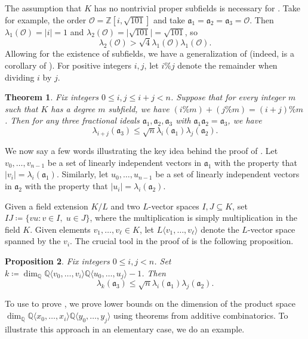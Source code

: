 \documentclass[letterpaper,10pt]{amsart}
\newcommand{\ZZ}{\mathbb{Z}}      %
\newcommand{\QQ}{\mathbb{Q}}      %
\newcommand{\cO}{\mathcal{O}}      %
\newcommand{\mfa}{\mathfrak{a}}
\newtheorem{theorem}{Theorem}[section]
\newtheorem{proposition}[theorem]{Proposition}
\theoremstyle{definition}
\theoremstyle{remark}
\begin{document}
The assumption that $K$ has no nontrivial proper subfields is necessary for . Take for example, the order $\cO = \ZZ[i,\sqrt{101}]$ and take $\mfa_1 = \mfa_2 = \mfa_3 = \cO$. Then $\lambda_1(\cO) = \lvert i \rvert = 1$ and $\lambda_2(\cO) = \lvert \sqrt{101} \rvert = \sqrt{101}$, so
\[
    \lambda_2(\cO) > \sqrt{4}\lambda_1(\cO)\lambda_1(\cO).
\]
Allowing for the existence of subfields, we have a generalization of  (indeed,  is a corollary of ). For positive integers $i,j$, let $i\%j$ denote the remainder when dividing $i$ by $j$.

\begin{theorem}
\label{thm:bound-subfield}
Fix integers $0 \leq i,j \leq i + j < n$. Suppose that for every integer $m$ such that $K$ has a degree $m$ subfield, we have $(i\%m) + (j\%m) = (i + j)\%m$. Then for any three fractional ideals $\mfa_1,\mfa_2,\mfa_3$ with $\mfa_1\mfa_2 = \mfa_3$, we have
\[
    \lambda_{i + j}(\mfa_3) \leq \sqrt{n}\lambda_i(\mfa_1)\lambda_j(\mfa_2).
\]
\end{theorem}

We now say a few words illustrating the key idea behind the proof of . Let $v_0,\dots,v_{n-1}$ be a set of linearly independent vectors in $\mfa_1$ with the property that $\lvert v_i \rvert = \lambda_i(\mfa_1)$. Similarly, let $u_0,\dots,u_{n-1}$ be a set of linearly independent vectors in $\mfa_2$ with the property that $\lvert u_i \rvert = \lambda_i(\mfa_2)$.

Given a field extension $K/L$ and two $L$-vector spaces $I,J \subseteq K$, set $IJ \coloneqq \{vu : v \in I, \; u \in J\}$, where the multiplication is simply multiplication in the field $K$. Given elements $v_1,\dots,v_{\ell} \in K$, let $L\langle v_1,\dots,v_{\ell}\rangle$ denote the $L$-vector space spanned by the $v_i$. The crucial tool in the proof of  is the following proposition. 

\begin{proposition}
\label{prop:mult-bound}
Fix integers $0 \leq i,j < n$. Set $k \coloneqq \dim_{\QQ}\QQ\langle v_0,\dots,v_i \rangle \QQ\langle u_0,\dots,u_j\rangle -1$. Then
\[
    \lambda_k(\mfa_3) \leq \sqrt{n}\lambda_i(\mfa_1)\lambda_j(\mfa_2).
\]
\end{proposition}

To use  to prove , we prove lower bounds on the dimension of the product space $\dim_{\QQ}\QQ\langle x_0,\dots,x_i \rangle \QQ\langle y_0,\dots,y_j\rangle$ using theorems from additive combinatorics. To illustrate this approach in an elementary case, we do an example.
\end{document}
